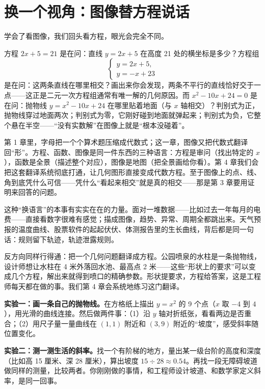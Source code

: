 \section{换一个视角：图像替方程说话}

学会了看图像，我们回头看方程，眼光会完全不同。

方程 $2x + 5 = 21$ 是在问：直线 $y = 2x + 5$ 在高度 21 处的横坐标是多少？方程组
\[
\begin{cases}
y = 2x + 5,\\
y = -x + 23
\end{cases}
\]
是在问：这两条直线在哪里相交？画出来你会发现，两条不平行的直线恰好交于一点——这正是二元一次方程组通常有唯一解的几何原因。而 $x^2 - 10x + 24 = 0$ 是在问：抛物线 $y = x^2 - 10x + 24$ 在哪里贴着地面（与 $x$ 轴相交）？判别式为正，抛物线穿过地面两次；判别式为零，它刚好碰到地面就弹起来；判别式为负，它整个悬在半空——“没有实数解”在图像上就是“根本没碰着”。

\begin{lianjie}
第 1 章里，字母把一个个算术题压缩成代数式；这一章，图像又把代数式翻译回“形”。方程、函数、图像是同一件东西的三种语言：方程是审问（找出特定的 $x$），函数是全景（描述整个对应），图像是地图（把全景画给你看）。第 4 章我们会把这套翻译系统彻底打通，让几何图形直接变成代数方程。至于图像上的点、线、角到底凭什么可信——凭什么“看起来相交”就是真的相交——那是第 3 章要用证明来回答的问题。
\end{lianjie}

这种“换语言”的本事有实实在在的力量。面对一堆数据——比如过去一年每月的电费——直接看数字很难有感觉；描成图像，趋势、异常、周期全都跳出来。天气预报的温度曲线、股票软件的起起伏伏、体测报告里的生长曲线，背后都是同一句话：规则留下轨迹，轨迹泄露规则。

反方向同样行得通：把一个几何问题翻译成方程。公园喷泉的水柱是一条抛物线，设计师想让水柱在 4 米外落回水池、最高点 2 米——这些“形状上的要求”可以变成几个方程，解出来就得到喷口的精确参数。形状提要求，方程给答案，这是工程师每天都在做的事。我们第 4 章会系统地练习这门翻译。

\begin{shiyan}
\textbf{实验一：画一条自己的抛物线。}在方格纸上描出 $y = x^2$ 的 9 个点（$x$ 取 $-4$ 到 $4$），用光滑的曲线连接。然后做两件事：（1）沿 $y$ 轴对折纸张，看看两边是否重合；（2）用尺子量一量曲线在 $(1,1)$ 附近和 $(3,9)$ 附近的“坡度”，感受斜率随位置变化。

\textbf{实验二：测一测生活的斜率。}找一个有阶梯的地方，量出某一级台阶的高度和深度（比如高 15 厘米、深 28 厘米），算出坡度 $15 \div 28 \approx 0.54$。再找一段无障碍坡道做同样的测量，比较两者。你刚刚做的事情，和工程师设计坡道、和数学家定义斜率，是同一回事。
\end{shiyan}

